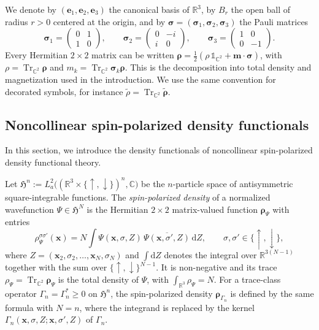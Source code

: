 \documentclass[final,reqno]{amsart}
\theoremstyle{remark}
\renewcommand{\ge}{\geqslant}
\newcommand{\wt}[1]{\widetilde{#1}}
\newcommand{\spu}{\uparrow}
\newcommand{\spd}{\downarrow}
\DeclareMathOperator{\Tr}{Tr}
\newcommand{\Trs}{\Tr_{\CC^2}}
\newcommand{\RR}{\mathbb{R}}
\newcommand{\CC}{\mathbb{C}}
\newcommand{\iden}{\mathbb{1}}
\newcommand{\dd}{\mathrm{d}}
\newcommand{\HF}{\mathfrak{H}}
\begin{document}
We denote by $(\mathbf{e}_1,\mathbf{e}_2,\mathbf{e}_3)$ the canonical basis of $\RR^3$, by $B_r$ the open ball of radius $r>0$ centered at the origin, and by $\bm{\sigma}=(\bm{\sigma}_1,\bm{\sigma}_2,\bm{\sigma}_3)$ the Pauli matrices
$$
\bm{\sigma}_1=\begin{pmatrix}0&1\\1&0\end{pmatrix},\qquad\bm{\sigma}_2=\begin{pmatrix}0&-i\\i&0\end{pmatrix},\qquad\bm{\sigma}_3=\begin{pmatrix}1&0\\0&-1\end{pmatrix}.
$$
Every Hermitian $2\times 2$ matrix can be written $\bm{\rho}=\frac12(\rho\,\iden_{\CC^2}+\mathbf{m}\cdot\bm{\sigma})$, with $\rho=\Trs\bm{\rho}$ and $m_k=\Trs\bm{\sigma}_k\bm{\rho}$. This is the decomposition into total density and magnetization used in the introduction. We use the same convention for decorated symbols, for instance $\wt{\rho}=\Trs\wt{\bm{\rho}}$.

\subsection{Noncollinear spin-polarized density functionals}\label{sec:functionals}
In this section, we introduce the density functionals of noncollinear spin-polarized density functional theory.

Let ${\HF^n:=L^2_a\big((\RR^3\times \{\spu,\spd\})^n,\CC\big)}$ be the $n$-particle space of antisymmetric square-integrable functions. The \emph{spin-polarized density} of a normalized wavefunction ${\Psi\in\HF^N}$ is the Hermitian $2\times 2$ matrix-valued function $\bm{\rho}_\Psi$ with entries~\cite{von1972local,gontier2013n}
$$
\rho_\Psi^{\sigma\sigma'}(\mathbf{x})=N\int\Psi(\mathbf{x},\sigma,Z)\,\overline{\Psi(\mathbf{x},\sigma',Z)}\,\dd Z,\qquad \sigma,\sigma'\in\{\spu,\spd\},
$$
where $Z=(\mathbf{x}_2,\sigma_2,\ldots,\mathbf{x}_N,\sigma_N)$ and $\int\dd Z$ denotes the integral over $\RR^{3(N-1)}$ together with the sum over $\{\spu,\spd\}^{N-1}$. It is non-negative and its trace $\rho_\Psi=\Trs\bm{\rho}_\Psi$ is the total density of $\Psi$, with $\int_{\RR^3}\rho_\Psi=N$. For a trace-class operator $\Gamma_n=\Gamma_n^*\ge0$ on $\HF^n$, the spin-polarized density $\bm{\rho}_{\Gamma_n}$ is defined by the same formula with $N=n$, where the integrand is replaced by the kernel $\Gamma_n(\mathbf{x},\sigma,Z;\mathbf{x},\sigma',Z)$ of $\Gamma_n$.
\end{document}

